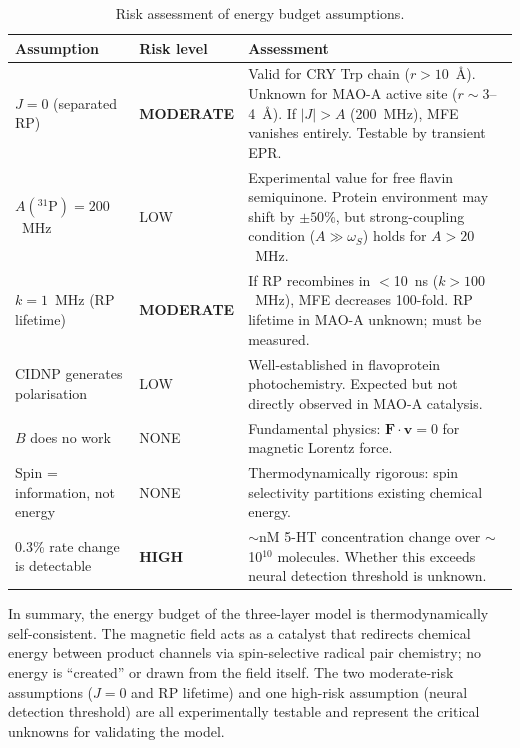 \begin{table}[h]
\centering
\caption{Risk assessment of energy budget assumptions.}
\label{tab:risk}
\small
\begin{tabular}{@{}llp{7cm}@{}}
\toprule
Assumption & Risk level & Assessment \\
\midrule
$J = 0$ (separated RP) & \textbf{MODERATE} & Valid for CRY Trp chain ($r > 10$~\AA). Unknown for MAO-A active site ($r \sim 3$--4~\AA). If $|J| > A$ (200~MHz), MFE vanishes entirely. Testable by transient EPR. \\
$A(^{31}\mathrm{P}) = 200$~MHz & LOW & Experimental value for free flavin semiquinone. Protein environment may shift by $\pm 50$\%, but strong-coupling condition ($A \gg \omega_S$) holds for $A > 20$~MHz. \\
$k = 1$~MHz (RP lifetime) & \textbf{MODERATE} & If RP recombines in $<$10~ns ($k > 100$~MHz), MFE decreases 100-fold. RP lifetime in MAO-A unknown; must be measured. \\
CIDNP generates polarisation & LOW & Well-established in flavoprotein photochemistry\cite{Tsentalovich2002}. Expected but not directly observed in MAO-A catalysis. \\
$B$ does no work & NONE & Fundamental physics: $\mathbf{F} \cdot \mathbf{v} = 0$ for magnetic Lorentz force\cite{Steiner1989}. \\
Spin = information, not energy & NONE & Thermodynamically rigorous: spin selectivity partitions existing chemical energy. \\
0.3\% rate change is detectable & \textbf{HIGH} & $\sim$nM 5-HT concentration change over $\sim$10$^{10}$ molecules. Whether this exceeds neural detection threshold is unknown. \\
\bottomrule
\end{tabular}
\end{table}

In summary, the energy budget of the three-layer model is thermodynamically self-consistent. The magnetic field acts as a catalyst that redirects chemical energy between product channels via spin-selective radical pair chemistry; no energy is ``created'' or drawn from the field itself. The two moderate-risk assumptions ($J = 0$ and RP lifetime) and one high-risk assumption (neural detection threshold) are all experimentally testable and represent the critical unknowns for validating the model.

